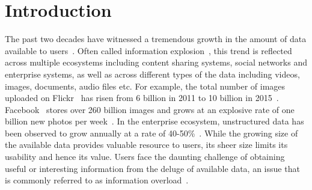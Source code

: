 \documentclass[12pt]{ucsddissertation}
\begin{document}
\mainmatter


\chapter{Introduction} 
The past two decades have witnessed a tremendous growth in the amount of data available to users~\cite{edmunds2000problem,ShuhuiAuthor15,IDCDataGrowth,Neilson2011}. Often called information explosion~\cite{van2002information}, this trend is reflected across multiple ecosystems including content sharing systems, social networks and enterprise systems, as well as across different types of the data including videos, images, documents, audio files etc. For example, the total number of images uploaded on Flickr~\cite{Flickr} has risen from 6 billion in 2011 to 10 billion in 2015~\cite{Flickr6B,Flickr10B}. Facebook~\cite{Facebook} stores over 260 billion images and grows at an explosive rate of one billion new photos per week~\cite{beaver2010finding}. In the enterprise ecosystem, unstructured data has been observed to grow annually at a rate of 40-50\%~\cite{IDCDataGrowth}. While the growing size of the available data provides valuable resource to users, its sheer size limits its usability and hence its value. Users face the daunting challenge of obtaining useful or interesting information from the deluge of available data, an issue that is commonly referred to as information overload~\cite{edmunds2000problem}.
\end{document}
